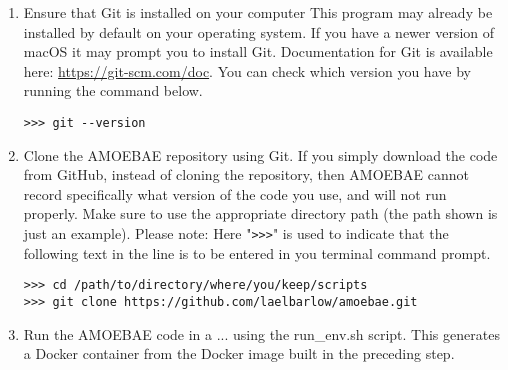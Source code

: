 \documentclass[12pt,letterpaper]{article}
\begin{document}
\begin{linenumbers}
\begin{enumerate}
\item Ensure that Git is installed on your computer This program may already be
    installed by default on your operating system. If you have a newer version
        of macOS it may prompt you to install Git. Documentation for Git is
        available here: \url{https://git-scm.com/doc}. You can check which
        version you have by running the command below.

\begin{lstlisting}
>>> git --version
\end{lstlisting}

\item Clone the AMOEBAE repository using Git. If you simply download the code
    from GitHub, instead of cloning the repository, then AMOEBAE cannot record
        specifically what version of the code you use, and will not run
        properly. Make sure to use the appropriate directory path (the path
        shown is just an example).  Please note: Here "\texttt{>{}>{}>}" is
        used to indicate that the following text in the line is to be entered
        in you terminal command prompt.

\begin{lstlisting}
>>> cd /path/to/directory/where/you/keep/scripts
>>> git clone https://github.com/laelbarlow/amoebae.git
\end{lstlisting}


%



\item Run the AMOEBAE code in a ... using the run\_env.sh script. This generates a Docker
    container from the Docker image built in the preceding step. 


\end{enumerate}
\end{linenumbers}
\end{document}
